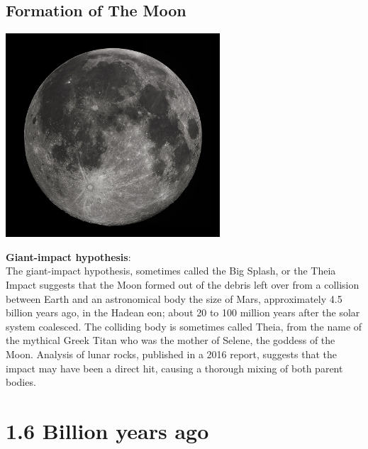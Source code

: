 \documentclass[11pt]{report}
\begin{document}
\section{Formation of The Moon}
\vspace{2mm}\begin{center}\includegraphics[width=8cm]{./img/moon.jpg}\end{center}
\textbf{Giant-impact hypothesis}:\\
The giant-impact hypothesis, sometimes called the Big Splash, or the Theia Impact suggests that the Moon formed out of the debris left over from a collision between Earth and an astronomical body the size of Mars, approximately 4.5 billion years ago, in the Hadean eon; about 20 to 100 million years after the solar system coalesced. The colliding body is sometimes called Theia, from the name of the mythical Greek Titan who was the mother of Selene, the goddess of the Moon. Analysis of lunar rocks, published in a 2016 report, suggests that the impact may have been a direct hit, causing a thorough mixing of both parent bodies.

\chapter{1.6 Billion years ago}
\end{document}

